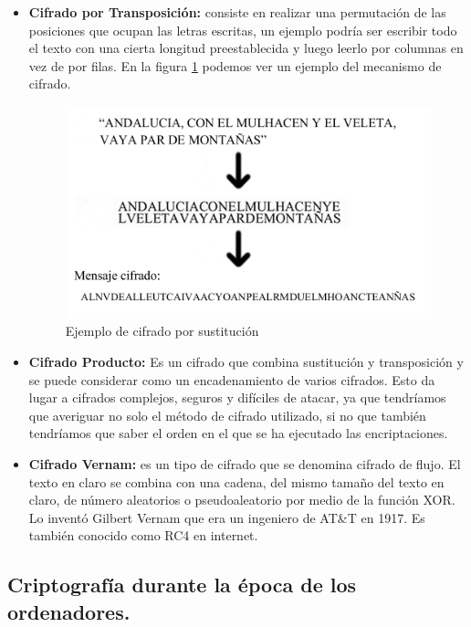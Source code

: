 \begin{itemize}
	\item \textbf{Cifrado por Transposición:} consiste en realizar una permutación de las posiciones que ocupan las letras escritas, un ejemplo podría ser escribir todo el texto con una cierta longitud preestablecida y luego leerlo por columnas en vez de por filas. En la figura \ref{fig:cifradoTransposicion} podemos ver un ejemplo del mecanismo de cifrado.  

\begin{figure}[h]
  \centering
    \includegraphics[scale=0.4]{./ConocimientosPrevios/imagenes/cifradoTransposicion.png}
  \caption{Ejemplo de cifrado por sustitución}
  \label{fig:cifradoTransposicion}
\end{figure}	

	\item \textbf{Cifrado Producto:} Es un cifrado que combina sustitución y transposición y se puede considerar como un encadenamiento de varios cifrados. Esto da lugar a cifrados complejos, seguros y difíciles de atacar, ya que tendríamos que averiguar no solo el método de cifrado utilizado, si no que también tendríamos que saber el orden en el que se ha ejecutado las encriptaciones.

	\item \textbf{Cifrado Vernam:} es un tipo de cifrado que se denomina cifrado de flujo. El texto en claro se combina con una cadena, del mismo tamaño del texto en claro, de número aleatorios o pseudoaleatorio por medio de la función XOR. Lo inventó Gilbert Vernam que era un ingeniero de AT\&T en 1917. Es también conocido como RC4 en internet.  
	
\end{itemize}

\subsection{Criptografía durante la época de los ordenadores.}

